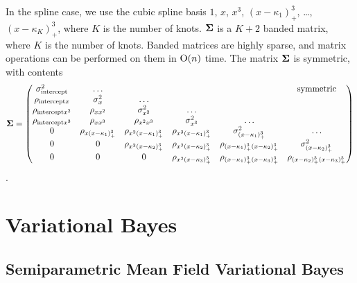 \documentclass{amsart}[12pt]
\begin{document}
In the spline case, we use the cubic spline basis $1$, $x$, $x^3$, $(x - \kappa_1)^3_+$, \ldots, $(x -
\kappa_K)^3_+$, where $K$ is the number of knots. ${\boldsymbol \Sigma}$ is a $K + 2$ banded matrix, where $K$ is the
number of knots. Banded matrices are highly sparse, and matrix operations can be performed on them in
$\text{O}(n)$ time. The matrix ${\boldsymbol \Sigma}$ is symmetric, with contents
\[
	{\boldsymbol \Sigma} =
	\begin{pmatrix}
		\sigma^2_{\text{intercept}} & \ldots                      &                             &                               &                                          & \text{symmetric}              \\
		\rho_{\text{intercept} x} & \sigma^2_x & \ldots\\
		\rho_{\text{intercept} x^2} & \rho_{x x^2} & \sigma^2_{x^2} & \ldots \\
		\rho_{\text{intercept} x^3} & \rho_{x x^3} & \rho_{x^2 x^3} & \sigma^2_{x^3} & \ldots \\
		0                           & \rho_{x (x - \kappa_1)^3_+} & \rho_{x^2 (x-\kappa_1)_+^3} & \rho_{x^3 (x - \kappa_1)_+^3} & \sigma^2_{(x - \kappa_1)_+^3}            & \ldots                        \\
		0                           & 0                           & \rho_{x^2 (x-\kappa_2)_+^3} & \rho_{x^3 (x-\kappa_2)_+^3}   & \rho_{(x-\kappa_1)_+^3 (x-\kappa_2)_+^3} & \sigma^2_{(x - \kappa_2)_+^3} \\
		0 & 0 & 0 & \rho_{x^3 (x - \kappa_3)_+^3} & \rho_{(x - \kappa_1)_+^3 (x - \kappa_3)_+^3} & \rho_{(x - \kappa_2)_+^3 (x - \kappa_3)_+^3} \\
	\end{pmatrix}
\].

\section{Variational Bayes}
\label{sec:vb}



\subsection{Semiparametric Mean Field Variational Bayes}
\end{document}
